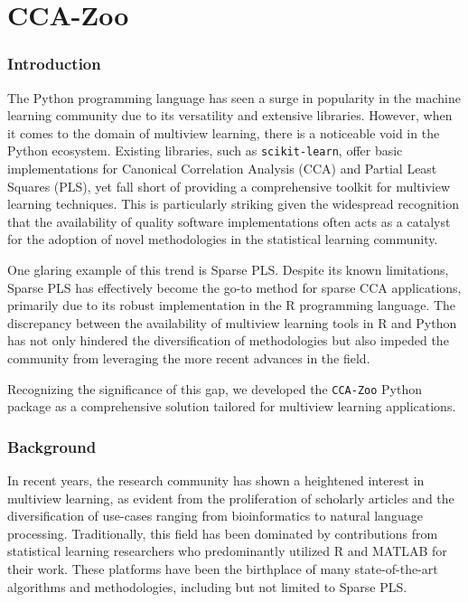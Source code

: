 \chapter{CCA-Zoo}\label{sec:ccazoo}

\subsection{Introduction}

The Python programming language has seen a surge in popularity in the machine learning community due to its versatility and extensive libraries. However, when it comes to the domain of multiview learning, there is a noticeable void in the Python ecosystem. Existing libraries, such as \texttt{scikit-learn}\cite{scikit-learn}, offer basic implementations for Canonical Correlation Analysis (CCA) and Partial Least Squares (PLS), yet fall short of providing a comprehensive toolkit for multiview learning techniques. This is particularly striking given the widespread recognition that the availability of quality software implementations often acts as a catalyst for the adoption of novel methodologies in the statistical learning community.

One glaring example of this trend is Sparse PLS. Despite its known limitations, Sparse PLS has effectively become the go-to method for sparse CCA applications, primarily due to its robust implementation in the R programming language. The discrepancy between the availability of multiview learning tools in R and Python has not only hindered the diversification of methodologies but also impeded the community from leveraging the more recent advances in the field.

Recognizing the significance of this gap, we developed the \texttt{CCA-Zoo} Python package as a comprehensive solution tailored for multiview learning applications.

\subsection{Background}

In recent years, the research community has shown a heightened interest in multiview learning, as evident from the proliferation of scholarly articles and the diversification of use-cases ranging from bioinformatics to natural language processing.
Traditionally, this field has been dominated by contributions from statistical learning researchers who predominantly utilized R and MATLAB for their work.
These platforms have been the birthplace of many state-of-the-art algorithms and methodologies, including but not limited to Sparse PLS.

